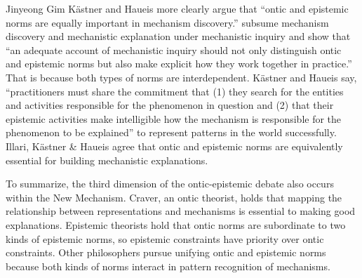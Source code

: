 \begin{artengenv}{Jinyeong Gim}
Kästner and Haueis
\parencite*[][p.1636]{kastner_discovering_2021} %
 more clearly argue that ``ontic and epistemic norms are equally important in mechanism discovery.'' 
\parencite[][p.1637]{kastner_discovering_2021} %
 subsume mechanism discovery and mechanistic explanation under mechanistic inquiry and show that ``an adequate account of mechanistic inquiry should not only distinguish ontic and epistemic norms but also make explicit how they work together in practice.'' That is because both types of norms are interdependent. Kästner and Haueis 
\parencite*[][p.1658]{kastner_discovering_2021} %
 say, ``practitioners must share the commitment that (1) they search for the entities and activities responsible for the phenomenon in question and (2) that their epistemic activities make intelligible how the mechanism is responsible for the phenomenon to be explained'' to represent patterns in the world successfully. Illari, Kästner \& Haueis agree that ontic and epistemic norms are equivalently essential for building mechanistic explanations.

To summarize, the third dimension of the ontic-epistemic debate also occurs within the New Mechanism. Craver, an ontic theorist, holds that mapping the relationship between representations and mechanisms is essential to making good explanations. Epistemic theorists hold that ontic norms are subordinate to two kinds of epistemic norms, so epistemic constraints have priority over ontic constraints. Other philosophers pursue unifying ontic and epistemic norms because both kinds of norms interact in pattern recognition of mechanisms.


\end{artengenv}
